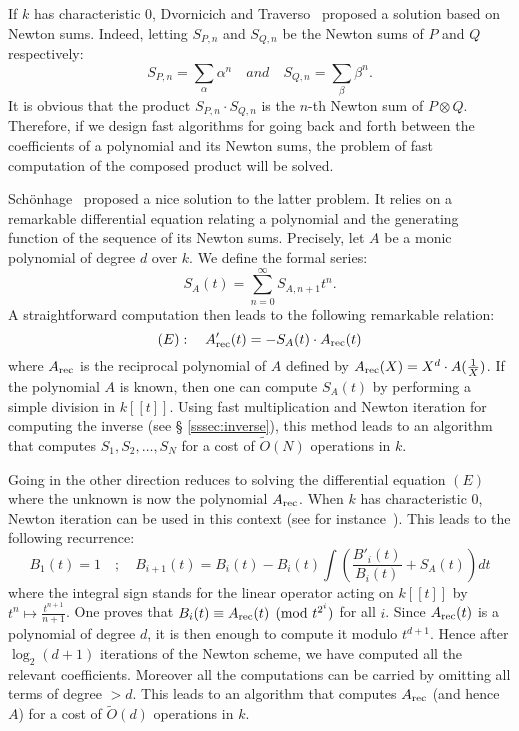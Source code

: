 \documentclass[11pt]{article}
\numberwithin{equation}{section}
\numberwithin{figure}{section}
\theoremstyle{definition}
\newcommand{\rec}{\text{\rm rec}}
\newcommand{\softO}{\tilde O}
\begin{document}
If $k$ has characteristic $0$, Dvornicich and Traverso~\cite{DvTr89} proposed
a solution based on Newton sums. Indeed, letting $S_{P,n}$ and $S_{Q,n}$ 
be the Newton sums of $P$ and $Q$ respectively:
$$S_{P,n} = \sum_\alpha \alpha^n \quad and \quad 
S_{Q,n} = \sum_\beta \beta^n.$$
It is obvious that the product $S_{P,n} \cdot S_{Q,n}$ is the $n$-th 
Newton sum of $P \otimes Q$. Therefore, if we design fast algorithms for 
going back and forth between the coefficients of a polynomial and its 
Newton sums, the problem of fast computation of the composed product 
will be solved.

Schönhage~\cite{Sc82} proposed a nice solution to the latter problem. 
It relies on a remarkable differential equation relating a polynomial
and the generating function of the sequence of its Newton sums.
Precisely, let $A$ be a monic polynomial of degree $d$ over $k$. 
We define the formal series:
$$S_A(t) = \sum_{n=0}^\infty S_{A,n+1} t^n.$$
A straightforward computation then leads to the following remarkable relation:
$$(E) : \quad A_\rec'(t) = - S_A(t) \cdot A_\rec(t)$$
where $A_\rec$ is the reciprocal polynomial of $A$ defined by $A_\rec(X) 
= X^d \cdot A(\frac 1 X)$.
If the polynomial $A$ is known, then one can compute $S_A(t)$ 
by performing a simple division in $k[\![t]\!]$. Using fast 
multiplication and Newton iteration for computing the inverse (see \S 
\ref{sssec:inverse}), this method leads to an algorithm that computes 
$S_1, S_2, \ldots, S_N$ for a cost of $\softO(N)$ operations in $k$.

Going in the other direction reduces to solving the differential equation 
$(E)$ where the unknown is now the polynomial $A_\rec$. When $k$ has 
characteristic $0$, Newton iteration can be used in this context (see 
for instance~\cite{BoChLeSaSc07}). This leads to the following 
recurrence:
$$B_1(t) = 1 \quad ; \quad
B_{i+1}(t) = B_i(t) - B_i(t) 
\int \left(\frac{B'_i(t)}{B_i(t)} + S_A(t) \right)dt$$
where the integral sign stands for the linear operator acting on 
$k[\![t]\!]$ by $t^n \mapsto \frac{t^{n+1}}{n+1}$.
One proves that $B_i(t) \equiv A_\rec(t) \pmod {t^{2^i}}$ for all 
$i$. Since $A_\rec(t)$ is a polynomial of degree $d$, it is then enough 
to compute it modulo $t^{d+1}$. Hence after $\log_2 (d{+}1)$ iterations 
of the Newton scheme, we have computed all the relevant coefficients. 
Moreover all the computations can be carried by omitting all terms of 
degree $> d$. This leads to an algorithm that computes $A_\rec$ (and 
hence $A$) for a cost of $\softO(d)$ operations in $k$.
\end{document}
